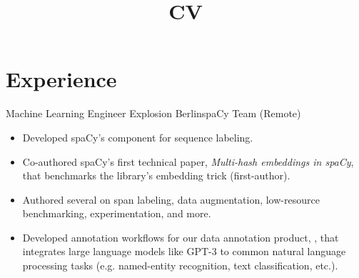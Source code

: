 \documentclass[12pt,a4paper]{moderncv}
\title{CV}
\begin{document}
\maketitle


\section{Experience}

{Machine Learning Engineer}
{Explosion}
{Berlin}{spaCy Team (Remote)}
{
    \begin{itemize}
        \item Developed spaCy's {\color{blue}} component for sequence
        labeling.
        \item Co-authored spaCy's first technical paper, \textit{Multi-hash
        embeddings in spaCy}, that benchmarks the library's embedding trick
        (first-author).
        \item Authored several {\color{blue}} on span labeling,
        data augmentation, low-resource benchmarking, experimentation, and more.
        \item Developed annotation workflows for our data annotation product,
        {\color{blue}}, that integrates
        large language models like GPT-3 to common natural language processing
        tasks (e.g. named-entity recognition, text classification, etc.). 
    \end{itemize}
}
\end{document}
